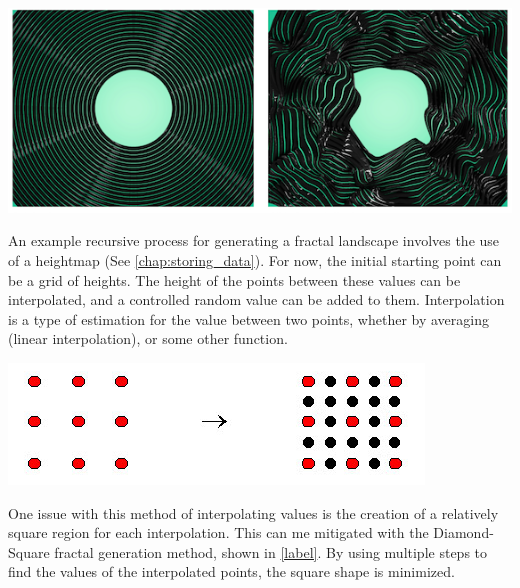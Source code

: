 \documentclass[10pt]{report}
\begin{document}
		\begin{minipage}{\textwidth}
			\centering
			\includegraphics[scale=1.0]{fractal_displacement1}
			\label{fig:fractal_displacement1}
		\end{minipage}
		
		An example recursive process for generating a fractal landscape involves the use of a heightmap (See \autoref{chap:storing_data}). For now, the initial starting point can be a grid of heights. The height of the points between these values can be interpolated, and a controlled random value can be added to them. Interpolation is a type of estimation for the value between two points, whether by averaging (linear interpolation), or some other function. 
		
		\begin{minipage}{\textwidth}
			\centering
			\includegraphics[scale=0.5]{m_alg1}
			\label{fig:m_alg1}
		\end{minipage}
	
		One issue with this method of interpolating values is the creation of a relatively square region for each interpolation. This can me mitigated with the Diamond-Square fractal generation method, shown in \autoref{label}. By using multiple steps to find the values of the interpolated points, the square shape is minimized. 
	
\end{document}
